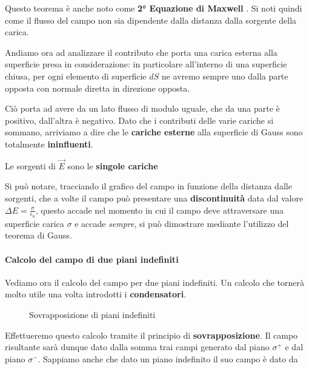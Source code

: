 \medskip
Questo teorema è anche noto come \textbf{2° Equazione di Maxwell} . Si noti quindi come il flusso del campo non sia dipendente dalla distanza dalla sorgente della carica. 

Andiamo ora ad analizzare il contributo che porta una carica esterna alla superficie presa in considerazione: 
in particolare all'interno di una superficie chiusa, per ogni elemento di superficie $dS$ ne avremo sempre uno dalla parte opposta con normale diretta in direzione opposta.

 Ciò porta ad avere da un lato flusso di modulo uguale, che da una parte è positivo, dall'altra è negativo. Dato che i contributi delle varie cariche si sommano, arriviamo a dire che le \textbf{cariche esterne} alla superficie di Gauss sono totalmente \textbf{ininfluenti}.

\begin{tcolorbox}
	\centering
	Le sorgenti di $\vec{E}$ sono le \textbf{singole cariche}
\end{tcolorbox}

Si può notare, tracciando il grafico del campo in funzione della distanza dalle sorgenti, che a volte il campo può presentare una \textbf{discontinuità} data dal valore $\Delta E = \frac{\sigma}{\epsilon_0}$, questo accade nel momento in cui il campo deve attraversare una superficie carica $\sigma$ e accade \textit{sempre}, si può dimostrare mediante l'utilizzo del teorema di Gauss.

\paragraph{Calcolo del campo di due piani indefiniti}

Vediamo ora il calcolo del campo per due piani indefiniti. Un calcolo che tornerà molto utile una volta introdotti i \textbf{condensatori}.

\begin{figure}[ht]
	\centering
	\caption{Sovrapposizione di piani indefiniti}
\end{figure}

Effettueremo questo calcolo tramite il principio di \textbf{sovrapposizione}.  Il campo risultante sarà dunque dato dalla somma trai campi generato dal piano $\sigma^+$ e dal piano $\sigma^-$. Sappiamo anche che dato un piano indefinito il suo campo è dato da


